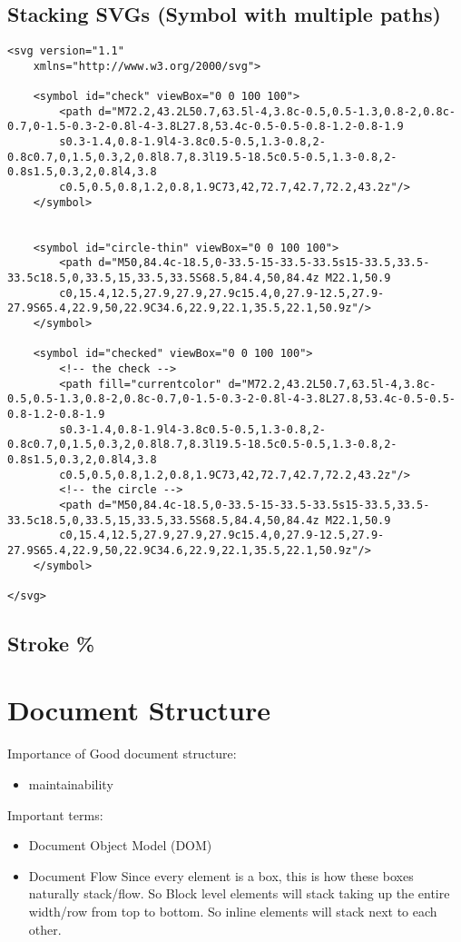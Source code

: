 \documentclass[]{article}
\newcommand{\<}{\guilsinglleft}
\renewcommand{\>}{\guilsinglright}
\begin{document}
\subsection{Stacking SVGs (Symbol with multiple paths)}
\begin{lstlisting}
<svg version="1.1"
	xmlns="http://www.w3.org/2000/svg">
	
	<symbol id="check" viewBox="0 0 100 100">
		<path d="M72.2,43.2L50.7,63.5l-4,3.8c-0.5,0.5-1.3,0.8-2,0.8c-0.7,0-1.5-0.3-2-0.8l-4-3.8L27.8,53.4c-0.5-0.5-0.8-1.2-0.8-1.9
		s0.3-1.4,0.8-1.9l4-3.8c0.5-0.5,1.3-0.8,2-0.8c0.7,0,1.5,0.3,2,0.8l8.7,8.3l19.5-18.5c0.5-0.5,1.3-0.8,2-0.8s1.5,0.3,2,0.8l4,3.8
		c0.5,0.5,0.8,1.2,0.8,1.9C73,42,72.7,42.7,72.2,43.2z"/>
	</symbol>
	
	
	<symbol id="circle-thin" viewBox="0 0 100 100">
		<path d="M50,84.4c-18.5,0-33.5-15-33.5-33.5s15-33.5,33.5-33.5c18.5,0,33.5,15,33.5,33.5S68.5,84.4,50,84.4z M22.1,50.9
		c0,15.4,12.5,27.9,27.9,27.9c15.4,0,27.9-12.5,27.9-27.9S65.4,22.9,50,22.9C34.6,22.9,22.1,35.5,22.1,50.9z"/>
	</symbol>
	
	<symbol id="checked" viewBox="0 0 100 100">
		<!-- the check -->
		<path fill="currentcolor" d="M72.2,43.2L50.7,63.5l-4,3.8c-0.5,0.5-1.3,0.8-2,0.8c-0.7,0-1.5-0.3-2-0.8l-4-3.8L27.8,53.4c-0.5-0.5-0.8-1.2-0.8-1.9
		s0.3-1.4,0.8-1.9l4-3.8c0.5-0.5,1.3-0.8,2-0.8c0.7,0,1.5,0.3,2,0.8l8.7,8.3l19.5-18.5c0.5-0.5,1.3-0.8,2-0.8s1.5,0.3,2,0.8l4,3.8
		c0.5,0.5,0.8,1.2,0.8,1.9C73,42,72.7,42.7,72.2,43.2z"/>
		<!-- the circle -->
		<path d="M50,84.4c-18.5,0-33.5-15-33.5-33.5s15-33.5,33.5-33.5c18.5,0,33.5,15,33.5,33.5S68.5,84.4,50,84.4z M22.1,50.9
		c0,15.4,12.5,27.9,27.9,27.9c15.4,0,27.9-12.5,27.9-27.9S65.4,22.9,50,22.9C34.6,22.9,22.1,35.5,22.1,50.9z"/>
	</symbol>

</svg>
\end{lstlisting}

\subsection{Stroke \%}

\section{Document Structure}
Importance of Good document structure:
\begin{itemize}
	\item maintainability
\end{itemize}
Important terms:
\begin{itemize}
	\item Document Object Model (DOM)
	
	\item Document Flow
	\subitem Since every element is a box, this is how these boxes naturally stack/flow.
	\subitem So Block level elements will stack taking up the entire width/row from top to bottom.
	\subitem So inline elements will stack next to each other.
\end{itemize}
\end{document}
